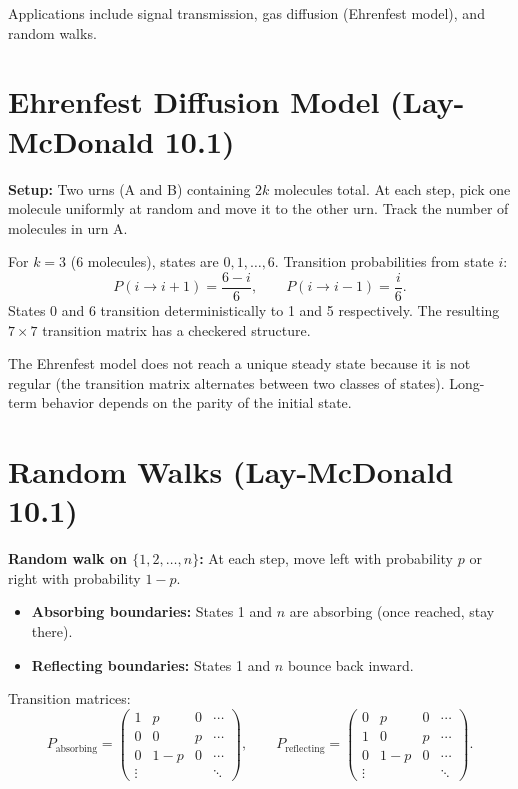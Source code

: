 Applications include signal transmission, gas diffusion (Ehrenfest model), and random walks.

\section{Ehrenfest Diffusion Model (Lay-McDonald 10.1)}

\textbf{Setup:} Two urns (A and B) containing $2k$ molecules total. At each step, pick one molecule uniformly at random and move it to the other urn. Track the number of molecules in urn A.

For $k=3$ (6 molecules), states are $0,1,\ldots,6$. Transition probabilities from state $i$:
\[
  P(i\to i+1) = \frac{6-i}{6}, \qquad P(i\to i-1) = \frac{i}{6}.
\]
States 0 and 6 transition deterministically to 1 and 5 respectively. The resulting $7\times7$ transition matrix has a checkered structure.

\begin{remark}
The Ehrenfest model does not reach a unique steady state because it is not regular (the transition matrix alternates between two classes of states). Long-term behavior depends on the parity of the initial state.
\end{remark}

\section{Random Walks (Lay-McDonald 10.1)}

\textbf{Random walk on $\{1,2,\ldots,n\}$:} At each step, move left with probability $p$ or right with probability $1-p$.

\begin{itemize}
  \item \textbf{Absorbing boundaries:} States 1 and $n$ are absorbing (once reached, stay there).
  \item \textbf{Reflecting boundaries:} States 1 and $n$ bounce back inward.
\end{itemize}

Transition matrices:
\[
P_{\text{absorbing}} = \begin{pmatrix}1&p&0&\cdots\\0&0&p&\cdots\\0&1-p&0&\cdots\\\vdots&&&\ddots\end{pmatrix}, \qquad
P_{\text{reflecting}} = \begin{pmatrix}0&p&0&\cdots\\1&0&p&\cdots\\0&1-p&0&\cdots\\\vdots&&&\ddots\end{pmatrix}.
\]

